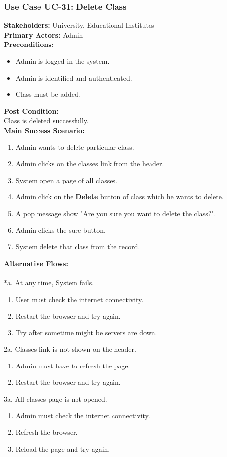 \documentclass[12pt]{article}
\begin{document}
\subsubsection{Use Case UC-31: Delete Class}
\textbf{Stakeholders: } University, Educational Institutes \\
\textbf{Primary Actors: } Admin \\
\textbf{Preconditions:}
\begin{itemize}
\item Admin is logged in the system.
\item Admin is identified and authenticated.
\item Class must be added.
\end{itemize}
\textbf{Post Condition: }\\
Class is deleted successfully.\\
\textbf{Main Success Scenario:}
\begin{enumerate}
\item Admin wants to delete particular class.
\item Admin clicks on the classes link from the header.
\item System open a page of all classes.
\item Admin click on the \textbf{Delete} button of class which he wants to delete.
\item A pop message show "Are you sure you want to delete the class?".
\item Admin clicks the sure button.
\item System delete that class from the record.
\end{enumerate}
\textbf{Alternative Flows:}\\
\\
*a. At any time, System fails.
\begin{enumerate}
\item User must check the internet connectivity.
\item Restart the browser and try again.
\item Try after sometime might be servers are down.
\end{enumerate}
\newpage
2a. Classes link is not shown on the header.
\begin{enumerate}
\item Admin must have to refresh the page.
\item Restart the browser and try again.
\end{enumerate} 
3a. All classes page is not opened.
\begin{enumerate}
\item Admin must check the internet connectivity.
\item Refresh the browser.
\item Reload the page and try again.
\end{enumerate}
\end{document}
